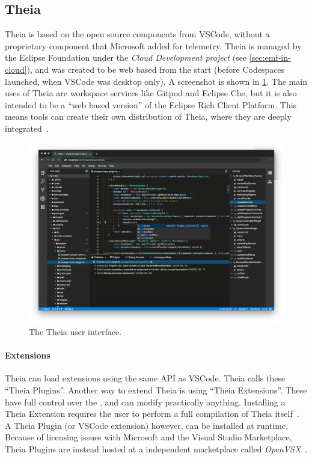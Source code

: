 \subsection{Theia}

Theia is based on the \gls{open source} components from \gls{VSCode}, without a proprietary component that Microsoft added for telemetry.
Theia is managed by the Eclipse Foundation under the \textit{Cloud Development project} (see \cref{sec:emf-in-cloud}), and was created to be web based from the start (before Codespaces launched, when \gls{VSCode} was desktop only).
A screenshot is shown in \cref{fig:theia-ui}.
The main uses of Theia are workspace services like \gls{Gitpod} and Eclipse Che, but it is also intended to be a ``web based version'' of the Eclipse Rich Client Platform.
This means tools can create their own distribution of Theia, where they are deeply integrated~\cite{helmingEclipseTheiaIDE2019a}.

\begin{figure}[htbp]  %
  \centering
  \includegraphics[width=\textwidth]{figures/pre-project/theia-screenshot.png}
  \caption[Theia User Interface]{The \gls{Theia} user interface.}\label{fig:theia-ui}
\end{figure}

\paragraph{Extensions}
Theia can load extensions using the same \acrfull{API} as \gls{VSCode}.
Theia calls these ``Theia Plugins''.
Another way to extend Theia is using ``Theia Extensions''.
These have full control over the , and can modify practically anything.
Installing a Theia Extension requires the user to perform a full compilation of \gls{Theia} itself~\cite{helmingHowAddExtensions2019}.
A Theia Plugin (or \gls{VSCode} extension) however, can be installed at runtime.
Because of licensing issues with Microsoft and the Visual Studio Marketplace, Theia Plugins are instead hosted at a independent marketplace called \textit{OpenVSX}~\cite{svenefftingeOpenVSX2020}.